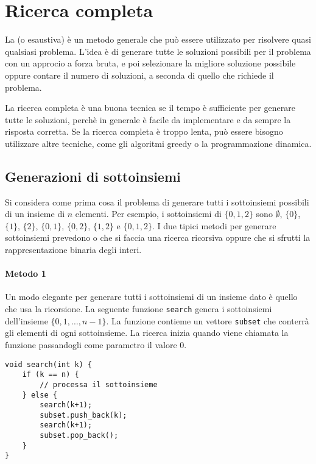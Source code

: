 \chapter{Ricerca completa}

La  (o esaustiva)
è un metodo generale che può essere utilizzato 
per risolvere quasi qualsiasi problema.
L'idea è di generare tutte le soluzioni
possibili per il problema con un approcio a forza bruta,
e poi selezionare la migliore soluzione possibile
oppure contare il numero di soluzioni, a seconda
di quello che richiede il problema.

La ricerca completa è una buona tecnica
se il tempo è sufficiente per generare tutte le soluzioni,
perchè in generale è facile da implementare
e da sempre la risposta corretta.
Se la ricerca completa è troppo lenta,
può essere bisogno utilizzare altre tecniche, 
come gli algoritmi greedy o la programmazione dinamica.

\section{Generazioni di sottoinsiemi}


Si considera come prima cosa il problema di 
generare tutti i sottoinsiemi possibili di 
un insieme di $n$ elementi.
Per esempio, i sottoinsiemi di $\{0,1,2\}$ sono
$\emptyset$, $\{0\}$, $\{1\}$, $\{2\}$, $\{0,1\}$,
$\{0,2\}$, $\{1,2\}$ e $\{0,1,2\}$.
I due tipici metodi per generare sottoinsiemi prevedono
o che si faccia una ricerca ricorsiva oppure
che si sfrutti la rappresentazione binaria degli interi.

\subsubsection{Metodo 1}

Un modo elegante per generare tutti i sottoinsiemi 
di un insieme dato è quello che usa la ricorsione.
La seguente funzione \texttt{search}
genera i sottoinsiemi dell'insieme
$\{0,1,\ldots,n-1\}$.
La funzione contieme un vettore \texttt{subset}
che conterrà gli elementi di ogni sottoinsieme.
La ricerca inizia quando viene chiamata la funzione
passandogli come parametro il valore 0.

\begin{lstlisting}
void search(int k) {
    if (k == n) {
        // processa il sottoinsieme
    } else {
        search(k+1);
        subset.push_back(k);
        search(k+1);
        subset.pop_back();
    }
}
\end{lstlisting}

